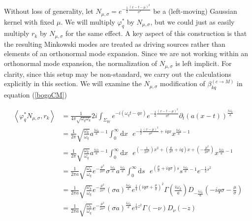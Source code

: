 \documentclass[12pt,a4paper]{article}
\newcommand{\dv}[1]{\mathrm{d} #1 \text{ }}
\begin{document}
Without loss of generality, let $N_{\mu, \sigma} = e^{-\frac{1}{2} \frac{(x-t-\mu)^2}{\sigma^2}}$ be a (left-moving) Gaussian kernel with fixed $\mu$. We will multiply $\varphi_q^*$ by $N_{\mu, \sigma}$, but we could just as easily multiply $r_k$ by $N_{\mu, \sigma}$ for the same effect. A key aspect of this construction is that the resulting Minkowski modes are treated as driving sources rather than elements of an orthonormal mode expansion. Since we are not working within an orthonormal mode expansion, the normalization of $N_{\mu, \sigma}$ is left implicit. For clarity, since this setup may be non-standard, we carry out the calculations explicitly in this section.  We will examine the $N_{\mu,\sigma}$ modification of $\beta^{(c \rightarrow M)}_{kq}$ in  equation (\ref{bogoCM})

\begin{equation}
  \begin{aligned}
    \left< \varphi_q^* N_{\mu,\sigma}, r_k\right> &= \frac{1}{4\pi \sqrt{\omega_q \omega_k}} 2i \int_{\Sigma_W} e^{-i(\omega_q t - q x)} e^{-\frac{1}{2} \frac{(x-t-\mu)^2}{\sigma^2}} \partial_t (a(x-t))^\frac{i\omega_k}{a} \\
    &= \frac{1}{2\pi} \sqrt{\frac{\omega_k}{\omega_q}} a^{\frac{i \omega_k}{a} - 1} \int_0^\infty  \dv{x} e^{-\frac{1}{2} \frac{(x-\mu)^2}{\sigma^2} + i q x} x^{\frac{i\omega_k}{a} - 1} \\
    &= \frac{1}{2\pi} \sqrt{\frac{\omega_k}{\omega_q}} a^{\frac{i \omega_k}{a} - 1} \int_0^\infty \dv{x} e^{\left(-\frac{1}{2\sigma^2}\right) x^2 + \left(\frac{\mu}{\sigma^2} + i q \right) x + \left( -\frac{\mu^2}{2\sigma^2}\right)} x^{\frac{i\omega_k}{a} - 1}  \\
    &= \frac{1}{2\pi a} \sqrt{\frac{\omega_k}{\omega_q}} e^{-\frac{\mu^2}{2 \sigma^2}} \sigma^{\frac{i\omega_k}{a}} a^{\frac{i \omega_k}{a} }  \int_0^\infty \dv{s} e^{(\frac{\mu}{\sigma} + i q \sigma)s} s^{\frac{i\omega_k}{a} - 1} e^{-\frac{1}{2} s^2} \\
    &= \frac{1}{2\pi a} \sqrt{\frac{\omega_k}{\omega_q}} e^{-\frac{\mu^2}{2 \sigma^2}} {(\sigma a)}^{\frac{i \omega_k}{a}} e^{\frac{1}{4}(i q \sigma + \frac{\mu}{\sigma})^2} \Gamma\left(\frac{i\omega_k}{a}\right) D_{-\frac{i\omega_k}{a}}(-i q\sigma - \frac{\mu}{\sigma}) \\
    &=  \frac{1}{2\pi a } \sqrt{\frac{\omega_k}{\omega_q}} e^{-\frac{\mu^2}{2 \sigma^2}}  (\sigma a)^\frac{i\omega_k}{a} e^{\frac{1}{4} z^2} \Gamma(-\nu) D_\nu(-z)
  \end{aligned}
\end{equation}
\end{document}
